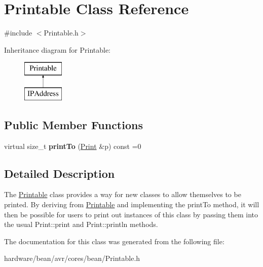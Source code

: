 \hypertarget{class_printable}{}\section{Printable Class Reference}
\label{class_printable}


{\ttfamily \#include $<$Printable.\+h$>$}

Inheritance diagram for Printable\+:\begin{figure}[H]
\begin{center}
\leavevmode
\includegraphics[height=2.000000cm]{class_printable}
\end{center}
\end{figure}
\subsection*{Public Member Functions}
\begin{DoxyCompactItemize}
\item 
\hypertarget{class_printable_a66dc1b6564dd9170070c2d724476f7c6}{}virtual size\+\_\+t {\bfseries print\+To} (\hyperlink{class_print}{Print} \&p) const  =0\label{class_printable_a66dc1b6564dd9170070c2d724476f7c6}

\end{DoxyCompactItemize}


\subsection{Detailed Description}
The \hyperlink{class_printable}{Printable} class provides a way for new classes to allow themselves to be printed. By deriving from \hyperlink{class_printable}{Printable} and implementing the print\+To method, it will then be possible for users to print out instances of this class by passing them into the usual Print\+::print and Print\+::println methods. 

The documentation for this class was generated from the following file\+:\begin{DoxyCompactItemize}
\item 
hardware/bean/avr/cores/bean/Printable.\+h\end{DoxyCompactItemize}
